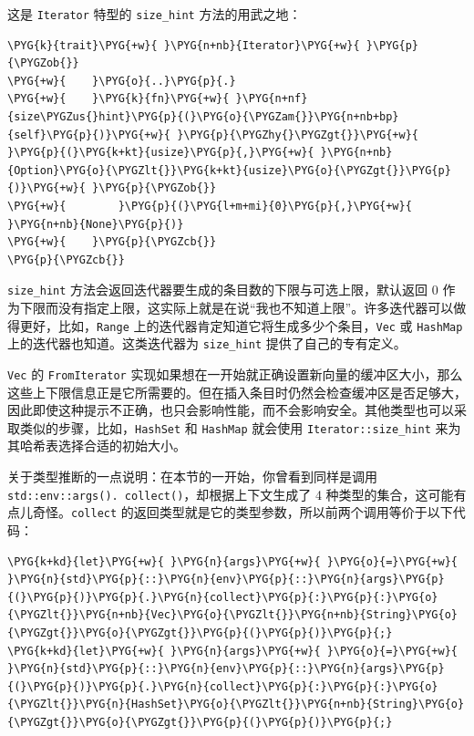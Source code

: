 这是 \texttt{Iterator} 特型的 \texttt{size\_hint} 方法的用武之地：

\begin{Verbatim}[commandchars=\\\{\},breaklines=true,breakanywhere=true,fontsize=\codefont,xleftmargin=17bp]
\PYG{k}{trait}\PYG{+w}{ }\PYG{n+nb}{Iterator}\PYG{+w}{ }\PYG{p}{\PYGZob{}}
\PYG{+w}{    }\PYG{o}{..}\PYG{p}{.}
\PYG{+w}{    }\PYG{k}{fn}\PYG{+w}{ }\PYG{n+nf}{size\PYGZus{}hint}\PYG{p}{(}\PYG{o}{\PYGZam{}}\PYG{n+nb+bp}{self}\PYG{p}{)}\PYG{+w}{ }\PYG{p}{\PYGZhy{}\PYGZgt{}}\PYG{+w}{ }\PYG{p}{(}\PYG{k+kt}{usize}\PYG{p}{,}\PYG{+w}{ }\PYG{n+nb}{Option}\PYG{o}{\PYGZlt{}}\PYG{k+kt}{usize}\PYG{o}{\PYGZgt{}}\PYG{p}{)}\PYG{+w}{ }\PYG{p}{\PYGZob{}}
\PYG{+w}{        }\PYG{p}{(}\PYG{l+m+mi}{0}\PYG{p}{,}\PYG{+w}{ }\PYG{n+nb}{None}\PYG{p}{)}
\PYG{+w}{    }\PYG{p}{\PYGZcb{}}
\PYG{p}{\PYGZcb{}}
\end{Verbatim}

\texttt{size\_hint} 方法会返回迭代器要生成的条目数的下限与可选上限，默认返回 0 作为下限而没有指定上限，这实际上就是在说“我也不知道上限”。许多迭代器可以做得更好，比如，\texttt{Range} 上的迭代器肯定知道它将生成多少个条目，\texttt{Vec} 或 \texttt{HashMap} 上的迭代器也知道。这类迭代器为 \texttt{size\_hint} 提供了自己的专有定义。

\texttt{Vec} 的 \texttt{FromIterator} 实现如果想在一开始就正确设置新向量的缓冲区大小，那么这些上下限信息正是它所需要的。但在插入条目时仍然会检查缓冲区是否足够大，因此即使这种提示不正确，也只会影响性能，而不会影响安全。其他类型也可以采取类似的步骤，比如，\texttt{HashSet} 和 \texttt{HashMap} 就会使用 \texttt{Iterator::size\_hint} 来为其哈希表选择合适的初始大小。

关于类型推断的一点说明：在本节的一开始，你曾看到同样是调用 \texttt{std::env::args(). collect()}，却根据上下文生成了 4 种类型的集合，这可能有点儿奇怪。\texttt{collect} 的返回类型就是它的类型参数，所以前两个调用等价于以下代码：

\begin{Verbatim}[commandchars=\\\{\},breaklines=true,breakanywhere=true,fontsize=\codefont,xleftmargin=17bp]
\PYG{k+kd}{let}\PYG{+w}{ }\PYG{n}{args}\PYG{+w}{ }\PYG{o}{=}\PYG{+w}{ }\PYG{n}{std}\PYG{p}{::}\PYG{n}{env}\PYG{p}{::}\PYG{n}{args}\PYG{p}{(}\PYG{p}{)}\PYG{p}{.}\PYG{n}{collect}\PYG{p}{:}\PYG{p}{:}\PYG{o}{\PYGZlt{}}\PYG{n+nb}{Vec}\PYG{o}{\PYGZlt{}}\PYG{n+nb}{String}\PYG{o}{\PYGZgt{}}\PYG{o}{\PYGZgt{}}\PYG{p}{(}\PYG{p}{)}\PYG{p}{;}
\PYG{k+kd}{let}\PYG{+w}{ }\PYG{n}{args}\PYG{+w}{ }\PYG{o}{=}\PYG{+w}{ }\PYG{n}{std}\PYG{p}{::}\PYG{n}{env}\PYG{p}{::}\PYG{n}{args}\PYG{p}{(}\PYG{p}{)}\PYG{p}{.}\PYG{n}{collect}\PYG{p}{:}\PYG{p}{:}\PYG{o}{\PYGZlt{}}\PYG{n}{HashSet}\PYG{o}{\PYGZlt{}}\PYG{n+nb}{String}\PYG{o}{\PYGZgt{}}\PYG{o}{\PYGZgt{}}\PYG{p}{(}\PYG{p}{)}\PYG{p}{;}
\end{Verbatim}

